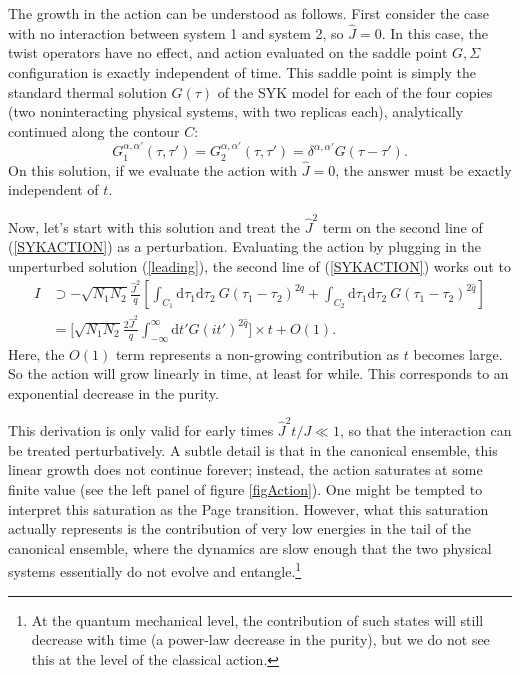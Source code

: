 \documentclass[12pt]{article}
\newcommand{\be}{\begin{equation}}
\newcommand{\ee}{\end{equation}}
\numberwithin{equation}{section}
\begin{document}
The growth in the action can be understood as follows. First consider the case with no interaction between system 1 and system 2, so $\widehat{J} = 0$. In this case, the twist operators have no effect, and action evaluated on the saddle point $G,\Sigma$ configuration is exactly independent of time. This saddle point is simply the standard thermal solution $G(\tau)$ of the SYK model for each of the four copies (two noninteracting physical systems, with two replicas each), analytically continued along the contour $C$:
	\be
G^{\alpha,\alpha'}_1(\tau,\tau') = G^{\alpha,\alpha'}_2(\tau,\tau') = \delta^{\alpha,\alpha'}G(\tau-\tau').\label{leading}
	\ee
On this solution, if we evaluate the action with $\widehat{J} = 0$, the answer must be exactly independent of $t$.

Now, let's start with this solution and treat the $\hat{J}^2$ term on the second line of (\ref{SYKACTION}) as a perturbation. Evaluating the action by plugging in the unperturbed solution (\ref{leading}), the second line of (\ref{SYKACTION}) works out to
	\begin{align}
I &\supset -\sqrt{N_1N_2}\frac{\hat{J}^2}{q}\left[\int_{C_1}\mathrm{d}\tau_1\mathrm{d}\tau_2  \ G(\tau_1-\tau_2)^{2\hat{q}} + \int_{C_2}\mathrm{d}\tau_1\mathrm{d}\tau_2  \ G(\tau_1-\tau_2)^{2\hat{q}}\right] \\
& = \bigg[\sqrt{N_1N_2}\frac{2\hat{J}^2}{q}\int_{-\infty}^\infty \mathrm{d}t' G(it')^{2\hat{q}}\bigg] \times t + O(1).\label{INITIAL}
	\end{align}
	Here, the $O(1)$ term represents a non-growing contribution as $t$ becomes large. So the action will grow linearly in time, at least for while. This corresponds to an exponential decrease in the purity.

This derivation is only valid for early times $\widehat{J}^2t/J \ll 1$, so that the interaction can be treated perturbatively. A subtle detail \cite{Gu:2017njx} is that in the canonical ensemble, this linear growth does not continue forever; instead, the action saturates at some finite value (see the left panel of figure \ref{figAction}). One might be tempted to interpret this saturation as the Page transition. However, what this saturation actually represents is the contribution of very low energies in the tail of the canonical ensemble, where the dynamics are slow enough that the two physical systems essentially do not evolve and entangle.\footnote{At the quantum mechanical level, the contribution of such states will still decrease with time (a power-law decrease in the purity), but we do not see this at the level of the classical action.}
\end{document}

